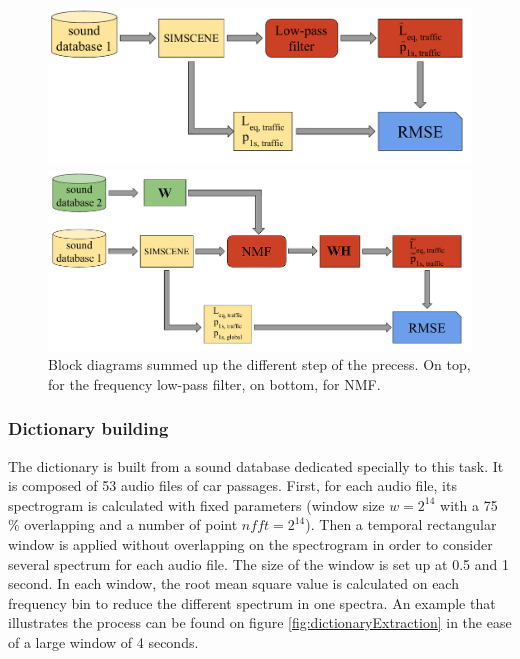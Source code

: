 \documentclass[twocolumn,a4paper,10pt]{article}
\begin{document}
\begin{figure}[!t]
\centering
	\begin{minipage}[t]{.48\textwidth}
		\centering
		\includegraphics[width=.9\linewidth]{../image/bloc_diagram_filtrage_EN.pdf} 
	\end{minipage}
	\begin{minipage}[t]{.48\textwidth}
		\centering
		\includegraphics[width=.9\linewidth]{../image/bloc_diagram_NMF_EN.pdf} 
	\end{minipage}
	\caption{Block diagrams summed up the different step of the precess. On top, for the frequency low-pass filter, on bottom, for NMF.}
	\label{fig:block_diagram_protocol}
\end{figure}

\subsubsection{Dictionary building}

The dictionary is built from a sound database dedicated specially to this task. It is composed of 53 audio files of car passages. First, for each audio file, its spectrogram is calculated with fixed parameters (window size $w = 2^{14}$ with a 75 $\%$ overlapping and a number of point $nfft = 2^{14}$). Then a temporal rectangular window is applied without overlapping on the spectrogram in order to consider several spectrum for each audio file. The size of the window is set up at 0.5 and 1 second. In each window, the root mean square value is calculated on each frequency bin to reduce the different spectrum in one spectra.  An example that illustrates the process can be found on figure \ref{fig:dictionaryExtraction} in the ease of a large window of 4 seconds. 
\end{document}
